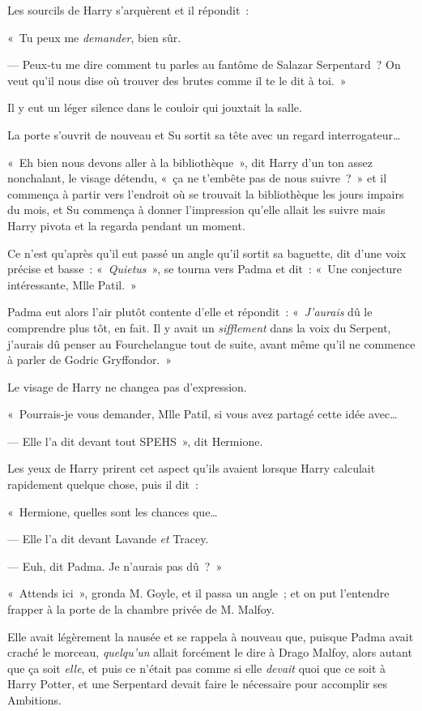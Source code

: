 Les sourcils de Harry s'arquèrent et il répondit~:

«~Tu peux me \emph{demander}, bien sûr.

--- Peux-tu me dire comment tu parles au fantôme de Salazar Serpentard~? On veut qu'il nous dise où trouver des brutes comme il te le dit à toi.~»

Il y eut un léger silence dans le couloir qui jouxtait la salle.

La porte s'ouvrit de nouveau et Su sortit sa tête avec un regard interrogateur…

«~Eh bien nous devons aller à la bibliothèque~», dit Harry d'un ton assez nonchalant, le visage détendu, «~ça ne t'embête pas de nous suivre~?~» et il commença à partir vers l'endroit où se trouvait la bibliothèque les jours impairs du mois, et Su commença à donner l'impression qu'elle allait les suivre mais Harry pivota et la regarda pendant un moment.

Ce n'est qu'après qu'il eut passé un angle qu'il sortit sa baguette, dit d'une voix précise et basse~: «~\emph{Quietus}~», se tourna vers Padma et dit~: «~Une conjecture intéressante, Mlle Patil.~»

Padma eut alors l'air plutôt contente d'elle et répondit~: «~\emph{J'aurais} dû le comprendre plus tôt, en fait. Il y avait un \emph{sifflement} dans la voix du Serpent, j'aurais dû penser au Fourchelangue tout de suite, avant même qu'il ne commence à parler de Godric Gryffondor.~»

Le visage de Harry ne changea pas d'expression.

«~Pourrais-je vous demander, Mlle Patil, si vous avez partagé cette idée avec…

--- Elle l'a dit devant tout SPEHS~», dit Hermione.

Les yeux de Harry prirent cet aspect qu'ils avaient lorsque Harry calculait rapidement quelque chose, puis il dit~:

«~Hermione, quelles sont les chances que…

--- Elle l'a dit devant Lavande \emph{et} Tracey.

--- Euh, dit Padma. Je n'aurais pas dû~?~»

\later

«~Attends ici~», gronda M. Goyle, et il passa un angle~; et on put l'entendre frapper à la porte de la chambre privée de M. Malfoy.

Elle avait légèrement la nausée et se rappela à nouveau que, puisque Padma avait craché le morceau, \emph{quelqu'un} allait forcément le dire à Drago Malfoy, alors autant que ça soit \emph{elle}, et puis ce n'était pas comme si elle \emph{devait} quoi que ce soit à Harry Potter, et une Serpentard devait faire le nécessaire pour accomplir ses Ambitions.

